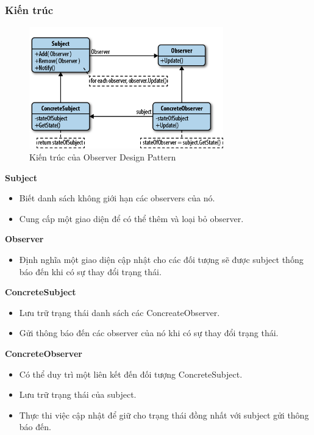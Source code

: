 \subsubsection{Kiến trúc}
\begin{figure}[H]
	\centering
	\includegraphics[width=0.75\textwidth]{Images/observer.png}
	\vspace{0.5cm}
	\caption{Kiến trúc của Observer Design Pattern}
\end{figure}
\hspace*{0.5cm} \textbf{Subject}
\begin{itemize}
	\item Biết danh sách không giới hạn các observers của nó.
	\item Cung cấp một giao diện để có thể thêm và loại bỏ observer.
\end{itemize}
\hspace*{0.5cm} \textbf{Observer}
\begin{itemize}
	\item Định nghĩa một giao diện cập nhật cho các đối tượng sẽ được subject thống báo đến khi có sự thay đổi trạng thái.
\end{itemize}
\hspace*{0.5cm} \textbf{ConcreteSubject}
\begin{itemize}
	\item Lưu trữ trạng thái danh sách các ConcreateObserver.
	\item Gửi thông báo đến các observer của nó khi có sự thay đổi trạng thái.
\end{itemize}
\hspace*{0.5cm} \textbf{ConcreteObserver}
\begin{itemize}
	\item Có thể duy trì một liên kết đến đối tượng ConcreteSubject.
	\item Lưu trữ trạng thái của subject.
	\item Thực thi việc cập nhật để giữ cho trạng thái đồng nhất với subject gửi thông báo đến.
\end{itemize}
